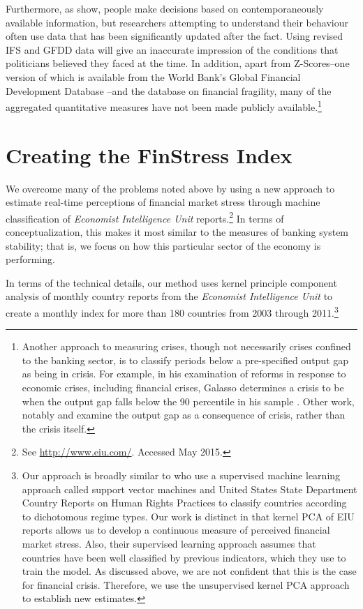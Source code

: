 \documentclass[]{article}
\begin{document}
Furthermore, as \cite{KayserLeininger2015} show, people make decisions based on contemporaneously available information, but researchers attempting to understand their behaviour often use data that has been significantly updated after the fact. Using revised IFS and GFDD data will give an inaccurate impression of the conditions that politicians believed they faced at the time. In addition, apart from Z-Scores--one version of which is available from the World Bank's Global Financial Development Database \citep{worldbank2013}--and the database on financial fragility, many of the aggregated quantitative measures have not been made publicly available.\footnote{Another approach to measuring crises, though not necessarily crises confined to the banking sector, is to classify periods below a pre-specified output gap as being in crisis. For example, in his examination of reforms in response to economic crises, including financial crises, Galasso determines a crisis to be when the output gap falls below the 90 percentile in his sample \citeyearpar[154]{galasso2014}. Other work, notably \cite{laeven2013} and \cite{Reinhart2009} examine the output gap as a consequence of crisis, rather than the crisis itself.}

\section{Creating the FinStress Index}

We overcome many of the problems noted above by using a new approach to estimate real-time perceptions of financial market stress through machine classification of \emph{Economist Intelligence Unit} reports.\footnote{See \url{http://www.eiu.com/}. Accessed May 2015.} In terms of conceptualization, this makes it most similar to the measures of banking system stability; that is, we focus on how this particular sector of the economy is performing.

In terms of the technical details, our method uses kernel principle component analysis \citep{Scholkopf1998,lodhi2002,Spirling2012} of monthly country reports from the \emph{Economist Intelligence Unit} to create a monthly index for more than 180 countries from 2003 through 2011.\footnote{Our approach is broadly similar to \cite{Minhas2015} who use a supervised machine learning approach called support vector machines and United States State Department Country Reports on Human Rights Practices to classify countries according to dichotomous regime types. Our work is distinct in that kernel PCA of EIU reports allows us to develop a continuous measure of perceived financial market stress. Also, their supervised learning approach assumes that countries have been well classified by previous indicators, which they use to train the model. As discussed above, we are not confident that this is the case for financial crisis. Therefore, we use the unsupervised kernel PCA approach to establish new estimates.}
\end{document}
